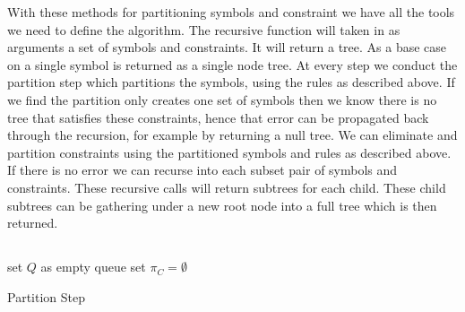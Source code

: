 With these methods for partitioning symbols and constraint we have all the tools we need to define the  algorithm. The recursive  function will taken in as arguments a set of symbols and constraints. It will return a tree. As a base case  on a single symbol is returned as a single node tree. At every step we conduct the partition step which partitions the symbols, using the rules as described above. If we find the partition only creates one set of symbols then we know there is no tree that satisfies these constraints, hence that error can be propagated back through the recursion, for example by returning a null tree. We can eliminate and partition constraints using the partitioned symbols and rules as described above. If there is no error we can recurse into each subset pair of symbols and constraints. These recursive calls will return subtrees for each child. These child subtrees can be gathering under a new root node into a full tree which is then returned.    

\subsection{}
\begin{algorithm}[H]
    \SetAlgoLined
     set $Q$ as empty queue\;
     set $\pi_C = \emptyset$\;
     
    
     \caption{Partition Step}
    \end{algorithm}

